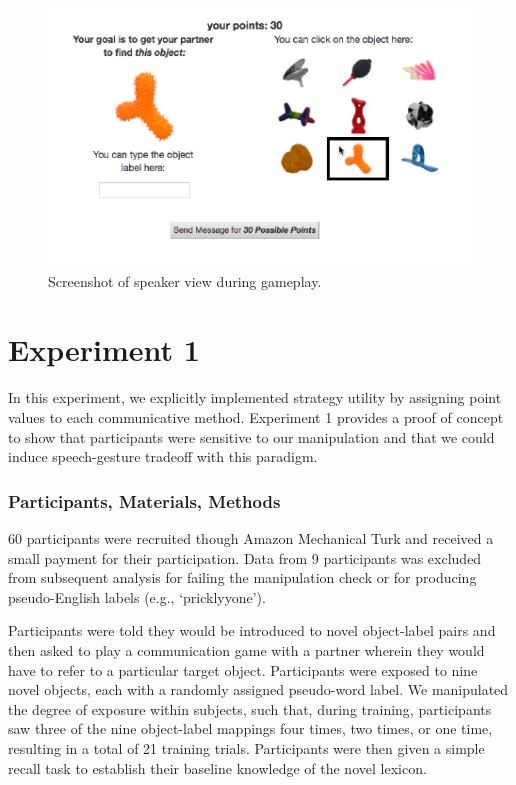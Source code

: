 \documentclass[10pt, letterpaper]{article}
\newenvironment{CodeChunk}{}{}
\begin{document}
\begin{CodeChunk}
\begin{figure}[H]

{\centering \includegraphics{figs/exp_screenshot-1} 

}

\caption[Screenshot of speaker view during gameplay]{Screenshot of speaker view during gameplay.}\label{fig:exp_screenshot}
\end{figure}
\end{CodeChunk}

\section{Experiment 1}\label{experiment-1}

In this experiment, we explicitly implemented strategy utility by
assigning point values to each communicative method. Experiment 1
provides a proof of concept to show that participants were sensitive to
our manipulation and that we could induce speech-gesture tradeoff with
this paradigm.

\subsubsection{Participants, Materials,
Methods}\label{participants-materials-methods}

60 participants were recruited though Amazon Mechanical Turk and
received a small payment for their participation. Data from 9
participants was excluded from subsequent analysis for failing the
manipulation check or for producing pseudo-English labels (e.g.,
`pricklyyone').

Participants were told they would be introduced to novel object-label
pairs and then asked to play a communication game with a partner wherein
they would have to refer to a particular target object. Participants
were exposed to nine novel objects, each with a randomly assigned
pseudo-word label. We manipulated the degree of exposure within
subjects, such that, during training, participants saw three of the nine
object-label mappings four times, two times, or one time, resulting in a
total of 21 training trials. Participants were then given a simple
recall task to establish their baseline knowledge of the novel lexicon.
\end{document}

